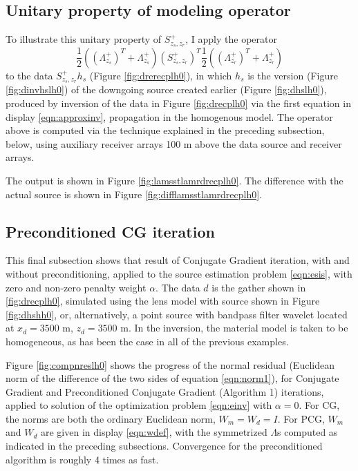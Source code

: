 \subsection{Unitary property of modeling operator}
To illustrate this unitary property of $S^+_{z_s,z_r}$, I apply the
operator
\[
  \frac{1}{2}((\Lambda^+_{z_s})^T+ \Lambda^+_{z_s})
  (S^{+}_{z_s,z_r})^T \frac{1}{2}((\Lambda^+_{z_r})^T+
  \Lambda^+_{z_r})
\]
to the data $S^+_{z_s,z_r}h_s$ (Figure \ref{fig:drerecplh0}), in which
$h_s$ is the version (Figure \ref{fig:dinvhslh0}) of the
downgoing source created earlier (Figure \ref{fig:dhslh0}), produced
by inversion of the data in Figure \ref{fig:drecplh0} via the first
equation in display \ref{eqn:approxinv}, propagation in the homogenous
model.  The operator above is computed via the technique explained in
the preceding subsection, below, using
auxiliary receiver arrays 100 m above the data source and receiver arrays.

The output is shown in Figure
\ref{fig:lamsstlamrdrecplh0}. The difference with the actual source is
shown in Figure \ref{fig:difflamsstlamrdrecplh0}.

\subsection{Preconditioned CG iteration}
This final subsection shows that result of Conjugate Gradient
iteration, with and without preconditioning, applied to the source
estimation problem \ref{eqn:esis}, with zero and non-zero penalty
weight $\alpha$. The data $d$ is the gather shown in
\ref{fig:drecplh0}, simulated using the lens model with source shown
in Figure \ref{fig:dhshh0}, or, alternatively, a point source with
bandpass filter wavelet located at $x_d=3500$ m, $z_d=3500$ m. In the inversion,
the material model is taken to be homogeneous, as has been the case in
all of the previous examples. 

Figure \ref{fig:compnreslh0} shows the progress of the normal residual
(Euclidean norm of the difference of the two sides of equation \ref{eqn:norm1}),
for Conjugate Gradient and Preconditioned Conjugate Gradient
(Algorithm 1) iterations, applied to solution of the optimization
problem \ref{eqn:einv} with $\alpha=0$. For CG, the norms are both the ordinary
Euclidean norm, $W_m=W_d=I$. For PCG, $W_m$ and $W_d$ are given in
display \ref{eqn:wdef}, with the symmetrized $\Lambda$s computed as
indicated in the preceding subsections. Convergence for the
preconditioned algorithm is roughly 4 times as fast.

